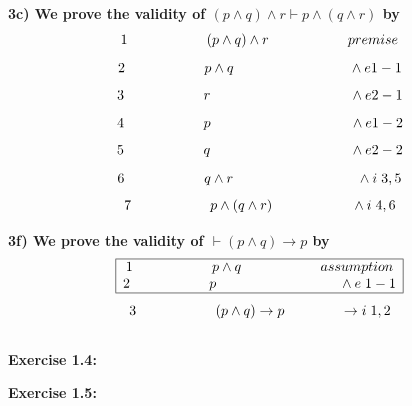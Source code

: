 \documentclass[a4paper]{article}
\begin{document}
\textbf{{\large\hspace{1 cm} 3c) We prove the validity of $(p \wedge q) \wedge r \vdash p \wedge (q \wedge r)$ by}}
{\large $$1 \hspace{2 cm} (p \wedge q) \wedge r \hspace{2 cm} premise$$ $$2 \hspace{2 cm}  p \wedge q \hspace{2.9 cm} \wedge e 1-1 $$
$$3 \hspace{2 cm} r \hspace{3.5 cm} \wedge e 2-1 $$
$$4 \hspace{2 cm} p \hspace{3.5 cm} \wedge e 1-2 $$
$$5 \hspace{2 cm} q \hspace{3.5 cm} \wedge e 2-2 $$
$$6 \hspace{2 cm} q \wedge r \hspace{3.1 cm} \wedge i \hspace{0.1cm} 3,5 $$
$$7 \hspace{2 cm} p \wedge ( q \wedge r) \hspace{2 cm} \wedge i \hspace{0.1 cm}4,6$$}

\textbf{{\large\hspace{1 cm} 3f) We prove the validity of $\vdash ( p \wedge q) \rightarrow p $ by}}
{\large $$\begin{array}{|c|}
\hline 
\textcolor{black}{1 \hspace{2 cm} p \wedge q \hspace{2 cm} assumption}\\
\textcolor{black}{2 \hspace{2 cm}  p \hspace{3.1 cm} \wedge e \hspace{0.1 cm} 1-1}\\
\hline
\end{array}$$
$$3 \hspace{2 cm} ( p \wedge q) \rightarrow p \hspace{1.4 cm} \rightarrow i \hspace{0.1 cm} 1,2$$}\\

\textbf{\large\hspace{0.5cm} Exercise 1.4:}

\textbf{\large\hspace{0.5cm} Exercise 1.5:}
\end{document}
